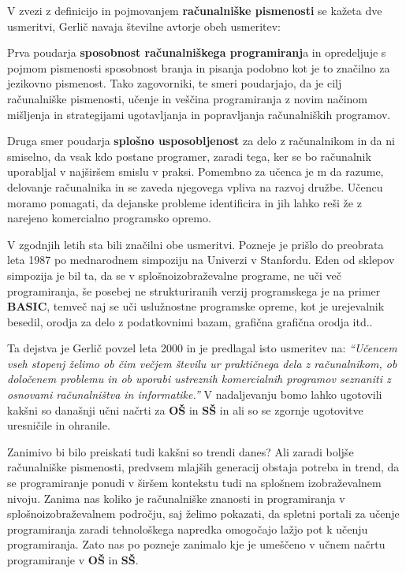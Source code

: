 V zvezi z definicijo in pojmovanjem \textbf{računalniške pismenosti}
se kažeta dve usmeritvi, Gerlič \cite{gerlic_2000} navaja številne
avtorje obeh usmeritev:

Prva poudarja \textbf{sposobnost računalniškega programiranj}a in
opredeljuje s pojmom pismenosti sposobnost branja in pisanja podobno
kot je to značilno za jezikovno pismenost. Tako zagovorniki, te smeri
poudarjajo, da je cilj računalniške pismenosti, učenje in veščina
programiranja z novim načinom mišljenja in strategijami ugotavljanja
in popravljanja računalniških programov.

Druga smer poudarja \textbf{splošno usposobljenost} za delo z
računalnikom in da ni smiselno, da vsak kdo postane programer, zaradi
tega, ker se bo računalnik uporabljal v najširšem smislu v
praksi. Pomembno za učenca je m da razume, delovanje računalnika in se
zaveda njegovega vpliva na razvoj družbe. Učencu moramo pomagati, da
dejanske probleme identificira in jih lahko reši že z narejeno
komercialno programsko opremo.

V zgodnjih letih sta bili značilni obe usmeritvi. Pozneje je prišlo do
preobrata leta 1987 po mednarodnem simpoziju na Univerzi v
Stanfordu. Eden od sklepov simpozija je bil ta, da se v
splošnoizobraževalne programe, ne uči več programiranja, še posebej ne
strukturiranih verzij programskega je na primer \textbf{BASIC}, temveč
naj se uči uslužnostne programske opreme, kot je urejevalnik besedil,
orodja za delo z podatkovnimi bazam, grafična grafična orodja itd..



Ta dejstva je Gerlič \cite{gerlic_2000} povzel leta 2000 in je
predlagal isto usmeritev na: \emph{``Učencem vseh stopenj želimo ob
  čim večjem številu ur praktičnega dela z računalnikom, ob določenem
  problemu in ob uporabi ustreznih komercialnih programov seznaniti z
  osnovami računalništva in informatike.''} V nadaljevanju bomo lahko
ugotovili kakšni so današnji učni načrti za \textbf{OŠ} in \textbf{SŠ}
in ali so se zgornje ugotovitve uresničile in ohranile.

Zanimivo bi bilo preiskati tudi kakšni so trendi danes? Ali zaradi
boljše računalniške pismenosti, predvsem mlajših generacij obstaja
potreba in trend, da se programiranje ponudi v širšem kontekstu tudi
na splošnem izobraževalnem nivoju.  Zanima nas koliko je računalniške
znanosti in programiranja v splošnoizobraževalnem področju, saj želimo
pokazati, da spletni portali za učenje programiranja zaradi
tehnološkega napredka omogočajo lažjo pot k učenju programiranja. Zato
nas po pozneje zanimalo kje je umeščeno v učnem načrtu programiranje v
\textbf{OŠ} in \textbf{SŠ}.

